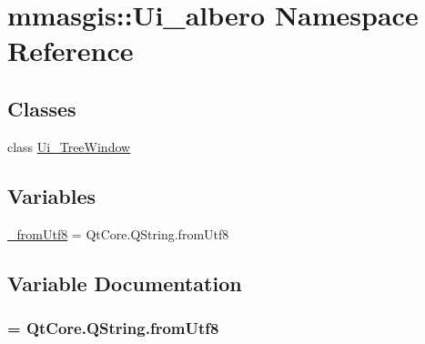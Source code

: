 \hypertarget{namespacemmasgis_1_1Ui__albero}{
\section{mmasgis::Ui\_\-albero Namespace Reference}
\label{namespacemmasgis_1_1Ui__albero}
}
\subsection*{Classes}
\begin{DoxyCompactItemize}
\item 
class \hyperlink{classmmasgis_1_1Ui__albero_1_1Ui__TreeWindow}{Ui\_\-TreeWindow}
\end{DoxyCompactItemize}
\subsection*{Variables}
\begin{DoxyCompactItemize}
\item 
\hyperlink{namespacemmasgis_1_1Ui__albero_ae82514cf3028633f6e1b8f1d59786437}{\_\-fromUtf8} = QtCore.QString.fromUtf8
\end{DoxyCompactItemize}


\subsection{Variable Documentation}
\hypertarget{namespacemmasgis_1_1Ui__albero_ae82514cf3028633f6e1b8f1d59786437}{
\subsubsection[{\_\-fromUtf8}]{ = QtCore.QString.fromUtf8}}
\label{namespacemmasgis_1_1Ui__albero_ae82514cf3028633f6e1b8f1d59786437}
